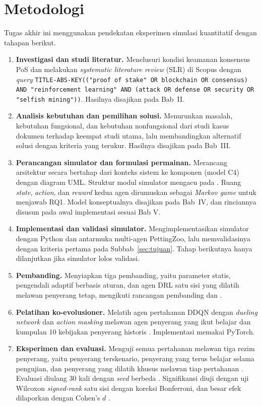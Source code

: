\section{Metodologi}
\label{sec:metodologi}
Tugas akhir ini menggunakan pendekatan eksperimen simulasi kuantitatif dengan tahapan berikut.
\begin{enumerate}
	\item \textbf{Investigasi dan studi literatur.} Menelusuri kondisi keamanan konsensus PoS dan melakukan \textit{systematic literature review} (SLR) di Scopus dengan \textit{query} \texttt{TITLE-ABS-KEY(("proof of stake" OR blockchain OR consensus) AND "reinforcement learning" AND (attack OR defense OR security OR "selfish mining"))}. Hasilnya disajikan pada Bab~II.
	\item \textbf{Analisis kebutuhan dan pemilihan solusi.} Menurunkan masalah, kebutuhan fungsional, dan kebutuhan nonfungsional dari studi kasus dokumen terhadap keempat studi utama, lalu membandingkan alternatif solusi dengan kriteria yang terukur. Hasilnya disajikan pada Bab~III.
	\item \textbf{Perancangan simulator dan formulasi permainan.} Merancang arsitektur secara bertahap dari konteks sistem ke komponen (model C4) dengan diagram UML. Struktur modul simulator mengacu pada \textcite{laneve2025stochastic}. Ruang \textit{state}, \textit{action}, dan \textit{reward} kedua agen dirumuskan sebagai \textit{Markov game} untuk menjawab RQ1. Model konseptualnya disajikan pada Bab~IV, dan rinciannya disusun pada awal implementasi sesuai Bab V.
	\item \textbf{Implementasi dan validasi simulator.} Mengimplementasikan simulator dengan Python dan antarmuka multi-agen PettingZoo, lalu memvalidasinya dengan kriteria pertama pada Subbab~\ref{sec:tujuan}. Tahap berikutnya hanya dilanjutkan jika simulator lolos validasi.
	\item \textbf{Pembanding.} Menyiapkan tiga pembanding, yaitu parameter statis, pengendali adaptif berbasis aturan, dan agen DRL satu sisi yang dilatih melawan penyerang tetap, mengikuti rancangan pembanding \textcite{skowronski2026adaptive} dan \textcite{wushishi2026coadam}.
	\item \textbf{Pelatihan ko-evolusioner.} Melatih agen pertahanan DDQN dengan \textit{dueling network} dan \textit{action masking} \parencite{skowronski2026adaptive} melawan agen penyerang yang ikut belajar dan kumpulan 10 kebijakan penyerang historis \parencite{wushishi2026coadam}. Implementasi memakai PyTorch.
	\item \textbf{Eksperimen dan evaluasi.} Menguji semua pertahanan melawan tiga rezim penyerang, yaitu penyerang terskenario, penyerang yang terus belajar selama pengujian, dan penyerang yang dilatih khusus melawan tiap pertahanan \parencite{wushishi2026coadam}. Evaluasi diulang 30 kali dengan \textit{seed} berbeda \parencite{skowronski2026adaptive}. Signifikansi diuji dengan uji Wilcoxon \textit{signed-rank} satu sisi dengan koreksi Bonferroni, dan besar efek dilaporkan dengan Cohen's $d$ \parencite{wushishi2026coadam}.

\end{enumerate}
